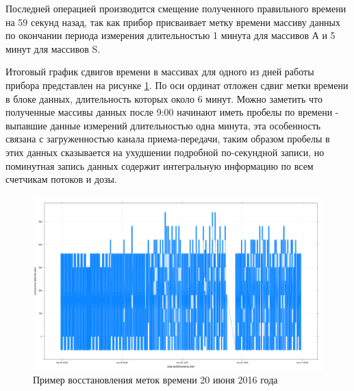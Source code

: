 Последней операцией производится смещение полученного правильного времени на 59 секунд назад, так как прибор присваивает метку времени массиву данных по окончании периода измерения длительностью 1 минута для массивов А и  5 минут для массивов S.

Итоговый график сдвигов времени в массивах для одного из дней работы прибора представлен на рисунке \ref{fig:deprontime172}. По оси ординат отложен сдвиг метки времени в блоке данных, длительность которых около 6 минут. Можно заметить что полученные массивы данных после 9:00 начинают иметь пробелы по времени - выпавшие данные измерений длительностью одна минута, эта особенность связана с загруженностью канала приема-передачи, таким образом пробелы в этих данных сказывается на ухудшении подробной по-секундной  записи, но поминутная запись данных содержит интегральную информацию по всем счетчикам потоков и дозы.

\begin{figure}
	\centering
	\includegraphics[width=0.9\linewidth]{images/depron_time_172}
	\caption{Пример восстановления меток времени 20 июня 2016 года}
	\label{fig:deprontime172}
\end{figure}






